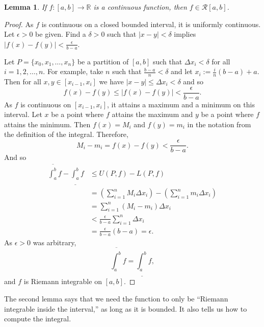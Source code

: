 \documentclass[12pt]{book}
\newcommand{\abs}[1]{\left\lvert {#1} \right\rvert}
\newcommand{\R}{{\mathbb{R}}}
\newcommand{\sR}{{\mathcal{R}}}
\theoremstyle{plain}
\newtheorem{lemma}[thm]{Lemma}
\theoremstyle{remark}
\theoremstyle{definition}
\theoremstyle{exercise}
\theoremstyle{example}
\begin{document}
\begin{lemma} \label{lemma:contint}
If $f \colon [a,b] \to \R$ is a continuous function,
then $f \in \sR[a,b]$.
\end{lemma}

\begin{proof}
As $f$ is continuous on a closed bounded interval, it is
uniformly continuous.
Let $\epsilon > 0$ be given.  Find a $\delta > 0$ such that
$\abs{x-y} < \delta$ implies $\abs{f(x)-f(y)} < \frac{\epsilon}{b-a}$.

Let $P = \{ x_0, x_1, \ldots, x_n \}$
be a partition of $[a,b]$ such that $\Delta x_i < \delta$ for all $i = 1,2,
\ldots, n$.  For example,
take $n$ such that $\frac{b-a}{n} < \delta$ and
let $x_i := \frac{i}{n}(b-a) + a$.
Then for all $x, y \in [x_{i-1},x_i]$ we have 
$\abs{x-y} \leq \Delta x_i < \delta$ and so
\begin{equation*}
f(x)-f(y) \leq \abs{f(x)-f(y)} < \frac{\epsilon}{b-a} .
\end{equation*}
As $f$ is continuous on $[x_{i-1},x_i]$, it attains a maximum and a minimum
on this interval.
Let $x$ be a point where $f$ attains the maximum and $y$ be a point
where $f$ attains the minimum.  Then $f(x) = M_i$
and $f(y) = m_i$ in the notation from the definition of the integral.
Therefore,
\begin{equation*}
M_i-m_i = f(x)-f(y) < 
\frac{\epsilon}{b-a} .
\end{equation*}
And so
\begin{equation*}
\begin{split}
\overline{\int_a^b} f - 
\underline{\int_a^b} f 
& \leq
U(P,f) - L(P,f)
\\
& =
\left(
\sum_{i=1}^n
M_i \Delta x_i
\right)
-
\left(
\sum_{i=1}^n
m_i \Delta x_i
\right)
\\
& =
\sum_{i=1}^n
(M_i-m_i) \Delta x_i
\\
& <
\frac{\epsilon}{b-a}
\sum_{i=1}^n
\Delta x_i
\\
& =
\frac{\epsilon}{b-a} (b-a)
= \epsilon .
\end{split}
\end{equation*}
As $\epsilon > 0$ was arbitrary,
\begin{equation*}
\overline{\int_a^b} f = \underline{\int_a^b} f ,
\end{equation*}
and $f$ is Riemann integrable on $[a,b]$.
\end{proof}

The second lemma says that we need the function to only be ``Riemann integrable
inside the interval,'' as long as it is bounded.  It also tells us how to
compute the integral.
\end{document}
